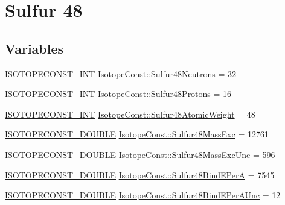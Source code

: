 \hypertarget{group___isotope_const-_sulfur-_s48}{}\section{Sulfur 48}
\label{group___isotope_const-_sulfur-_s48}
\subsection*{Variables}
\begin{DoxyCompactItemize}
\item 
\mbox{\hyperlink{group___isotope_const-_macros_ga5f18360b3e99483a35c32d789e62621c}{I\+S\+O\+T\+O\+P\+E\+C\+O\+N\+S\+T\+\_\+\+I\+NT}} \mbox{\hyperlink{group___isotope_const-_sulfur-_s48_ga9964ccf83ed658edb1267b224cb89285}{Isotope\+Const\+::\+Sulfur48\+Neutrons}} = 32
\item 
\mbox{\hyperlink{group___isotope_const-_macros_ga5f18360b3e99483a35c32d789e62621c}{I\+S\+O\+T\+O\+P\+E\+C\+O\+N\+S\+T\+\_\+\+I\+NT}} \mbox{\hyperlink{group___isotope_const-_sulfur-_s48_gad0f72fdb7a7c3eb3681f3f7d9f3981e7}{Isotope\+Const\+::\+Sulfur48\+Protons}} = 16
\item 
\mbox{\hyperlink{group___isotope_const-_macros_ga5f18360b3e99483a35c32d789e62621c}{I\+S\+O\+T\+O\+P\+E\+C\+O\+N\+S\+T\+\_\+\+I\+NT}} \mbox{\hyperlink{group___isotope_const-_sulfur-_s48_gadcdc6ca15433da68cb4363980fbd0546}{Isotope\+Const\+::\+Sulfur48\+Atomic\+Weight}} = 48
\item 
\mbox{\hyperlink{group___isotope_const-_macros_ga8f45a7272ce02c0b4c65c44636ed719a}{I\+S\+O\+T\+O\+P\+E\+C\+O\+N\+S\+T\+\_\+\+D\+O\+U\+B\+LE}} \mbox{\hyperlink{group___isotope_const-_sulfur-_s48_ga3efaa9312093dbc25d583adc3f46dc54}{Isotope\+Const\+::\+Sulfur48\+Mass\+Exc}} = 12761
\item 
\mbox{\hyperlink{group___isotope_const-_macros_ga8f45a7272ce02c0b4c65c44636ed719a}{I\+S\+O\+T\+O\+P\+E\+C\+O\+N\+S\+T\+\_\+\+D\+O\+U\+B\+LE}} \mbox{\hyperlink{group___isotope_const-_sulfur-_s48_ga7aba0126b26b6cf4102c29ba1e5e9bb3}{Isotope\+Const\+::\+Sulfur48\+Mass\+Exc\+Unc}} = 596
\item 
\mbox{\hyperlink{group___isotope_const-_macros_ga8f45a7272ce02c0b4c65c44636ed719a}{I\+S\+O\+T\+O\+P\+E\+C\+O\+N\+S\+T\+\_\+\+D\+O\+U\+B\+LE}} \mbox{\hyperlink{group___isotope_const-_sulfur-_s48_gaaf45d3b5ad477d46430af2be9d5d5f6c}{Isotope\+Const\+::\+Sulfur48\+Bind\+E\+PerA}} = 7545
\item 
\mbox{\hyperlink{group___isotope_const-_macros_ga8f45a7272ce02c0b4c65c44636ed719a}{I\+S\+O\+T\+O\+P\+E\+C\+O\+N\+S\+T\+\_\+\+D\+O\+U\+B\+LE}} \mbox{\hyperlink{group___isotope_const-_sulfur-_s48_ga157135c0b7bc8d901ca0187e978e5fcd}{Isotope\+Const\+::\+Sulfur48\+Bind\+E\+Per\+A\+Unc}} = 12

\end{DoxyCompactItemize}
